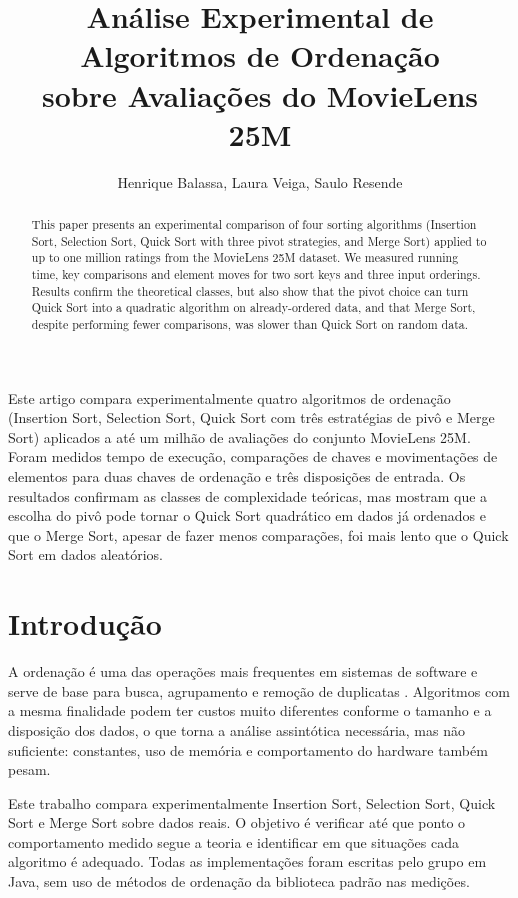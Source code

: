 \documentclass[12pt]{article}
\title{An\'alise Experimental de Algoritmos de Ordena\c{c}\~ao\\sobre Avalia\c{c}\~oes do MovieLens 25M}
\author{Henrique Balassa\inst{1}, Laura Veiga\inst{1}, Saulo Resende\inst{1}} %
\begin{document}
\maketitle

\begin{abstract}
This paper presents an experimental comparison of four sorting algorithms (Insertion Sort, Selection Sort, Quick Sort with three pivot strategies, and Merge Sort) applied to up to one million ratings from the MovieLens 25M dataset. We measured running time, key comparisons and element moves for two sort keys and three input orderings. Results confirm the theoretical classes, but also show that the pivot choice can turn Quick Sort into a quadratic algorithm on already-ordered data, and that Merge Sort, despite performing fewer comparisons, was slower than Quick Sort on random data.
\end{abstract}

\begin{resumo}
Este artigo compara experimentalmente quatro algoritmos de ordena\c{c}\~ao (Insertion Sort, Selection Sort, Quick Sort com tr\^es estrat\'egias de piv\^o e Merge Sort) aplicados a at\'e um milh\~ao de avalia\c{c}\~oes do conjunto MovieLens 25M. Foram medidos tempo de execu\c{c}\~ao, compara\c{c}\~oes de chaves e movimenta\c{c}\~oes de elementos para duas chaves de ordena\c{c}\~ao e tr\^es disposi\c{c}\~oes de entrada. Os resultados confirmam as classes de complexidade te\'oricas, mas mostram que a escolha do piv\^o pode tornar o Quick Sort quadr\'atico em dados j\'a ordenados e que o Merge Sort, apesar de fazer menos compara\c{c}\~oes, foi mais lento que o Quick Sort em dados aleat\'orios.
\end{resumo}

\section{Introdu\c{c}\~ao}

A ordena\c{c}\~ao \'e uma das opera\c{c}\~oes mais frequentes em sistemas de software e serve de base para busca, agrupamento e remo\c{c}\~ao de duplicatas \cite{cormen2012}. Algoritmos com a mesma finalidade podem ter custos muito diferentes conforme o tamanho e a disposi\c{c}\~ao dos dados, o que torna a an\'alise assint\'otica necess\'aria, mas n\~ao suficiente: constantes, uso de mem\'oria e comportamento do hardware tamb\'em pesam.

Este trabalho compara experimentalmente Insertion Sort, Selection Sort, Quick Sort e Merge Sort sobre dados reais. O objetivo \'e verificar at\'e que ponto o comportamento medido segue a teoria e identificar em que situa\c{c}\~oes cada algoritmo \'e adequado. Todas as implementa\c{c}\~oes foram escritas pelo grupo em Java, sem uso de m\'etodos de ordena\c{c}\~ao da biblioteca padr\~ao nas medi\c{c}\~oes.
\end{document}
